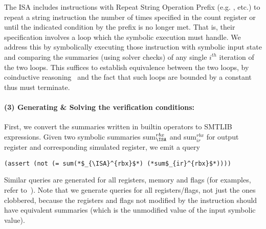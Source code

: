 The \ISA ISA includes instructions with Repeat String Operation 
Prefix (e.g. ,  etc.) to repeat a string instruction the 
number of times specified in the 
count register or until the indicated condition by the prefix is no longer met.
That is, their specification involves a loop which the symbolic 
execution must handle. We address this by symbolically executing those 
instruction with symbolic input state and comparing the summaries (using 
solver checks) of any single $i^{th}$ iteration of the two loops. This suffices 
to establish equivalence between the two loops, by coinductive 
reasoning~\cite{bisimulations} and the fact that such loops are bounded by a 
constant thus must terminate.




\paragraph{(3) Generating \& Solving the verification conditions:}

First, we convert the summaries written in \K builtin operators to SMTLIB 
expressions. Given two symbolic summaries sum$_{\ISA}^{rbx}$ and 
sum$_{ir}^{rbx}$ for output \ISA register  and corresponding 
simulated register, we emit a  query 
\begin{lstlisting}[style=KRULEWOBORDER]
            (assert (not (= sum(*$_{\ISA}^{rbx}$*) (*sum$_{ir}^{rbx}$*))))
\end{lstlisting}

Similar  queries are generated for all registers, memory and 
flags (for examples, refer to~\cite{Suppl}). Note that we
generate queries for all registers/flags, not just the
ones clobbered, because the registers and flags not modified by
the instruction should have equivalent summaries (which is the unmodified value
    of the input symbolic value).

